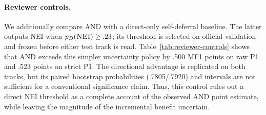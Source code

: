 \documentclass[11pt]{article}
\begin{document}
\paragraph{Reviewer controls.}
We additionally compare AND with a direct-only self-deferral baseline. The latter outputs \textsc{NEI} when $p_D(\textsc{NEI})\geq .23$; its threshold is selected on official validation and frozen before either test track is read. Table~\ref{tab:reviewer-controls} shows that AND exceeds this simpler uncertainty policy by .500 MF1 points on raw P1 and .523 points on strict P1. The directional advantage is replicated on both tracks, but its paired bootstrap probabilities (.7805/.7920) and intervals are not sufficient for a conventional significance claim. Thus, this control rules out a direct \textsc{NEI} threshold as a complete account of the observed AND point estimate, while leaving the magnitude of the incremental benefit uncertain.

\begin{table}[t]
\centering\scriptsize
{}
\caption{Frozen-policy reviewer controls. Self-deferral uses only the direct expert with validation-selected $\tau_D=.23$; AND uses $K=5,\tau=.49$. Raw/strict rows use no test labels for policy selection. The bootstrap probability is directional evidence, not a substitute for a confidence interval.}\label{tab:reviewer-controls}
\end{table}
\end{document}
